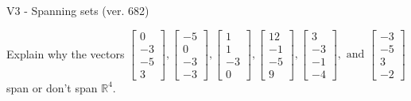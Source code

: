 \begin{exercise}
  \begin{exerciseTitle}V3 - Spanning sets (ver. 682)\end{exerciseTitle}
  \begin{exerciseStatement}
    Explain why the vectors \(\left[\begin{array}{r}
0 \\
-3 \\
-5 \\
3
\end{array}\right] , \left[\begin{array}{r}
-5 \\
0 \\
-3 \\
-3
\end{array}\right] , \left[\begin{array}{r}
1 \\
1 \\
-3 \\
0
\end{array}\right] , \left[\begin{array}{r}
12 \\
-1 \\
-5 \\
9
\end{array}\right] , \left[\begin{array}{r}
3 \\
-3 \\
-1 \\
-4
\end{array}\right] , \text{ and } \left[\begin{array}{r}
-3 \\
-5 \\
3 \\
-2
\end{array}\right]\) span or don't span \(\mathbb{R}^4\). 
	



\end{exerciseStatement}
\end{exercise}
